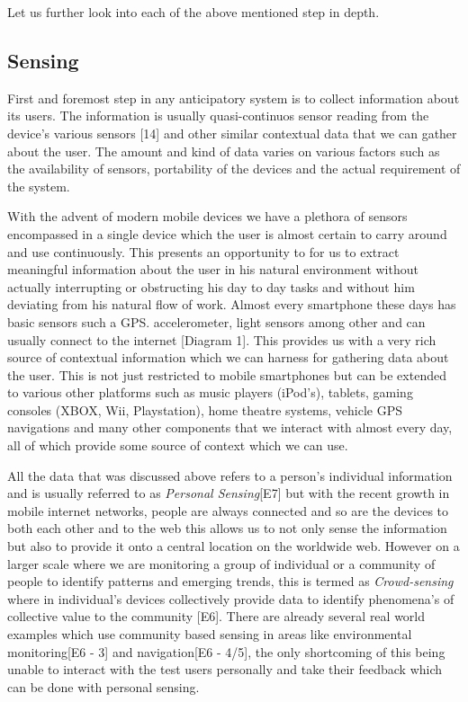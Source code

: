 \documentclass[12pt]{report}
\begin{document}
Let us further look into each of the above mentioned step in depth.

\subsection{Sensing}
First and foremost step in any anticipatory system is to collect information about its users. The information is usually quasi-continuos sensor reading from the device's various sensors [14] and other similar contextual data that we can gather about the user. The amount and kind of data varies on various factors such as the availability of sensors, portability of the devices and the actual requirement of the system.

With the advent of modern mobile devices we have a plethora of sensors encompassed in a single device which the user is almost certain to carry around and use continuously. This presents an opportunity to for us to extract meaningful information about the user in his natural environment without actually interrupting or obstructing his day to day tasks and without him deviating from his natural flow of work. Almost every smartphone these days has basic sensors such a GPS. accelerometer, light sensors among other and can usually connect to the internet [Diagram 1]. This provides us with a very rich source of contextual information which we can harness for gathering data about the user. This is not just restricted to mobile smartphones but can be extended to various other platforms such as music players (iPod's), tablets, gaming consoles (XBOX, Wii, Playstation), home theatre systems, vehicle GPS navigations and many other components that we interact with almost every day, all of which provide some source of context which we can use.

All the data that was discussed above refers to a person's individual information and is usually referred to as \textit{Personal Sensing}[E7] but with the recent growth in mobile internet networks, people are always connected and so are the devices to both each other and to the web this allows us to not only sense the information but also to provide it onto a central location on the worldwide web. However on a larger scale where we are monitoring a group of individual or a community of people to identify patterns and emerging trends, this is termed as \textit{Crowd-sensing} where in individual's devices collectively provide data to identify phenomena's of collective value to the community [E6]. There are already several real world examples which use community based sensing in areas like environmental monitoring[E6 - 3] and navigation[E6 - 4/5], the only shortcoming of this being unable to interact with the test users personally and take their feedback which can be done with personal sensing.
\end{document}
